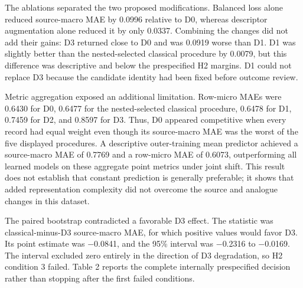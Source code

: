 \documentclass[referee,lineno,pdflatex,Numbered,sn-basic]{sn-jnl}
\begin{document}
The ablations separated the two proposed modifications. Balanced loss alone reduced source-macro MAE by 0.0996 relative to D0, whereas descriptor augmentation alone reduced it by only 0.0337. Combining the changes did not add their gains: D3 returned close to D0 and was 0.0919 worse than D1. D1 was slightly better than the nested-selected classical procedure by 0.0079, but this difference was descriptive and below the prespecified H2 margins. D1 could not replace D3 because the candidate identity had been fixed before outcome review.

Metric aggregation exposed an additional limitation. Row-micro MAEs were 0.6430 for D0, 0.6477 for the nested-selected classical procedure, 0.6478 for D1, 0.7459 for D2, and 0.8597 for D3. Thus, D0 appeared competitive when every record had equal weight even though its source-macro MAE was the worst of the five displayed procedures. A descriptive outer-training mean predictor achieved a source-macro MAE of 0.7769 and a row-micro MAE of 0.6073, outperforming all learned models on these aggregate point metrics under joint shift. This result does not establish that constant prediction is generally preferable; it shows that added representation complexity did not overcome the source and analogue changes in this dataset.

The paired bootstrap contradicted a favorable D3 effect. The statistic was classical-minus-D3 source-macro MAE, for which positive values would favor D3. Its point estimate was \ensuremath{-}0.0841, and the 95\% interval was \ensuremath{-}0.2316 to \ensuremath{-}0.0169. The interval excluded zero entirely in the direction of D3 degradation, so H2 condition 3 failed. Table 2 reports the complete internally prespecified decision rather than stopping after the first failed conditions.
\end{document}

